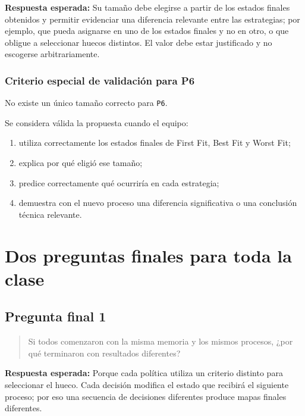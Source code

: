 \documentclass[
  spanish,
  letterpaper,
]{scrbook}
\providecommand{\tightlist}{%
  \setlength{\itemsep}{0pt}\setlength{\parskip}{0pt}}
\begin{document}
\textbf{Respuesta esperada:} Su tamaño debe elegirse a partir de los
estados finales obtenidos y permitir evidenciar una diferencia relevante
entre las estrategias; por ejemplo, que pueda asignarse en uno de los
estados finales y no en otro, o que obligue a seleccionar huecos
distintos. El valor debe estar justificado y no escogerse
arbitrariamente.

\subsection{Criterio especial de validación para
P6}\label{criterio-especial-de-validaciuxf3n-para-p6}

No existe un único tamaño correcto para \texttt{P6}.

Se considera válida la propuesta cuando el equipo:

\begin{enumerate}
\def\labelenumi{\arabic{enumi}.}
\tightlist
\item
  utiliza correctamente los estados finales de First Fit, Best Fit y
  Worst Fit;
\item
  explica por qué eligió ese tamaño;
\item
  predice correctamente qué ocurriría en cada estrategia;
\item
  demuestra con el nuevo proceso una diferencia significativa o una
  conclusión técnica relevante.
\end{enumerate}


\chapter{Dos preguntas finales para toda la
clase}\label{dos-preguntas-finales-para-toda-la-clase}

\section{Pregunta final 1}\label{pregunta-final-1}

\begin{quote}
Si todos comenzaron con la misma memoria y los mismos procesos, ¿por qué
terminaron con resultados diferentes?
\end{quote}

\textbf{Respuesta esperada:} Porque cada política utiliza un criterio
distinto para seleccionar el hueco. Cada decisión modifica el estado que
recibirá el siguiente proceso; por eso una secuencia de decisiones
diferentes produce mapas finales diferentes.
\end{document}
